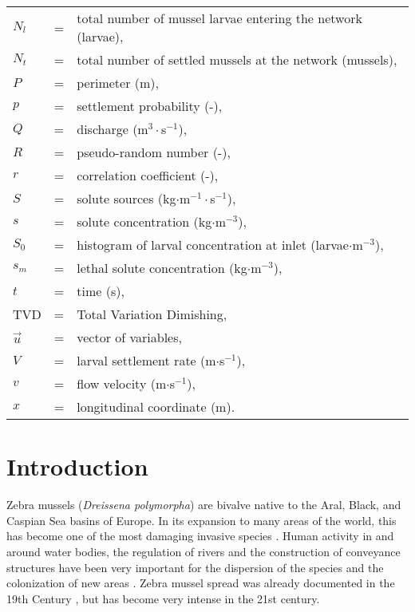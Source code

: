 \documentclass[review,authoryear]{elsarticle}
\begin{document}
{\begin{tabular}{lcl}
$N_l$ & = & total number of mussel larvae entering the network (larvae),\\
$N_t$ & = & total number of settled mussels at the network (mussels),\\
$P$ & = & perimeter (m),\\
$p$ & = & settlement probability (-),\\
$Q$ & = & discharge (m$^3\cdot$s$^{-1}$),\\
$R$ & = & pseudo-random number (-),\\
$r$ & = & correlation coefficient (-),\\
$S$ & = & solute sources (kg$\cdot$m$^{-1}\cdot$s$^{-1}$),\\
$s$ & = & solute concentration (kg$\cdot$m$^{-3}$),\\
$S_0$ & = & histogram of larval concentration at inlet (larvae$\cdot$m$^{-3}$),
	\\
$s_m$ & = & lethal solute concentration (kg$\cdot$m$^{-3}$),\\
$t$ & = & time (s),\\
TVD & = & Total Variation Dimishing,\\
$\vec{u}$ & = & vector of variables,\\
$V$ & = & larval settlement rate (m$\cdot$s$^{-1}$),\\
$v$ & = & flow velocity (m$\cdot$s$^{-1}$),\\
$x$ & = & longitudinal coordinate (m).\\
\end{tabular}
}

\section{Introduction}

Zebra mussels (\textit{Dreissena polymorpha}) are bivalve native to the Aral,
Black, and Caspian Sea basins of Europe. In its expansion to many areas of the
world, this has become one of the most damaging invasive species
\citep{USACE13}. Human activity in and around water bodies, the regulation of
rivers and the construction of conveyance structures have been very important
for the dispersion of the species and the colonization of new areas
\citep{Araujo06}. Zebra mussel spread was already documented in the 19th Century
\citep{Aldridge04}, but has become very intense in the 21st century.
\end{document}

